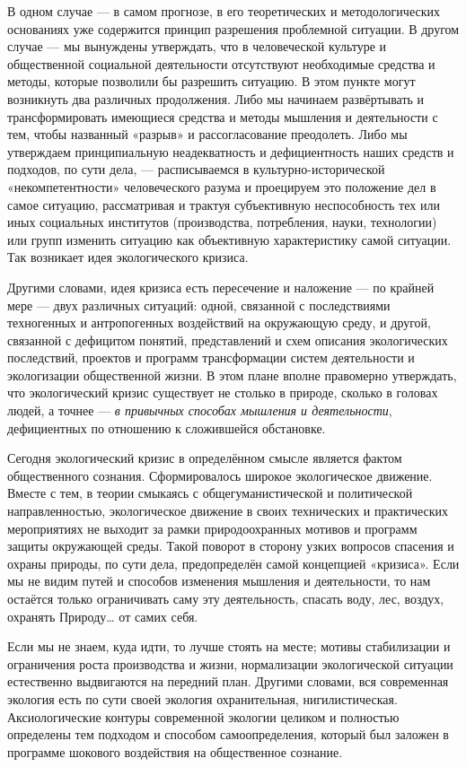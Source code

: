 \documentclass[11pt,a4paper]{article}
\begin{document}
В одном случае — в самом прогнозе, в его теоретических и методологических
основаниях уже содержится принцип разрешения проблемной ситуации. В другом
случае — мы вынуждены утверждать, что в человеческой культуре и общественной
социальной деятельности отсутствуют необходимые средства и методы, которые
позволили бы разрешить ситуацию. В этом пункте могут возникнуть два различных
продолжения. Либо мы начинаем развёртывать и трансформировать имеющиеся
средства и методы мышления и деятельности с тем, чтобы названный «разрыв» и
рассогласование преодолеть. Либо мы утверждаем принципиальную неадекватность и
дефициентность наших средств и подходов, по сути дела, — расписываемся в
культурно-исторической «некомпетентности» человеческого разума и проецируем
это положение дел в самое ситуацию, рассматривая и трактуя субъективную
неспособность тех или иных социальных институтов (производства, потребления,
науки, технологии) или групп изменить ситуацию как объективную характеристику
самой ситуации. Так возникает идея экологического кризиса. 

Другими словами, идея кризиса есть пересечение и наложение — по крайней мере —
двух различных ситуаций: одной, связанной с последствиями техногенных и
антропогенных воздействий на окружающую среду, и другой, связанной с дефицитом
понятий, представлений и схем описания экологических последствий, проектов и
программ трансформации систем деятельности и экологизации общественной жизни.
В этом плане вполне правомерно утверждать, что экологический кризис существует
не столько в природе, сколько в головах людей, а точнее — \emph{в привычных
  способах мышления и деятельности}, дефициентных по отношению к сложившейся
обстановке.

Сегодня экологический кризис в определённом смысле является фактом
общественного сознания. Сформировалось широкое экологическое движение. Вместе
с тем, в теории смыкаясь с общегуманистической и политической направленностью,
экологическое движение в своих технических и практических мероприятиях не
выходит за рамки природоохранных мотивов и программ защиты окружающей среды.
Такой поворот в сторону узких вопросов спасения и охраны природы, по сути
дела, предопределён самой концепцией «кризиса». Если мы не видим путей и
способов изменения мышления и деятельности, то нам остаётся только
ограничивать саму эту деятельность, спасать воду, лес, воздух, охранять
Природу… от самих себя.

Если мы не знаем, куда идти, то лучше стоять на месте; мотивы стабилизации и
ограничения роста производства и жизни, нормализации экологической ситуации
естественно выдвигаются на передний план. Другими словами, вся современная
экология есть по сути своей экология охранительная, нигилистическая.
Аксиологические контуры современной экологии целиком и полностью определены
тем подходом и способом самоопределения, который был заложен в программе
шокового воздействия на общественное сознание.
\end{document}
